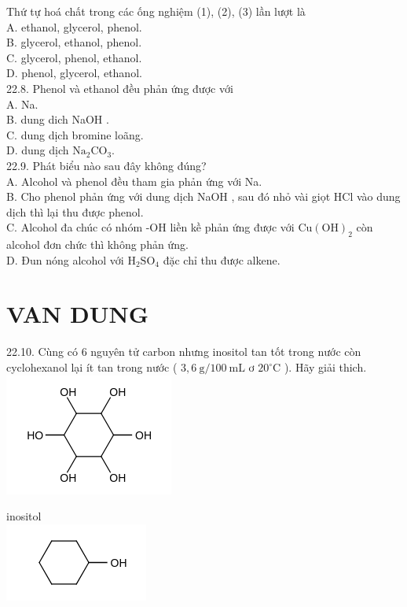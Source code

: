 \documentclass[10pt]{article}
\begin{document}
Thứ tự hoá chất trong các ống nghiệm (1), (2), (3) lần lượt là\\
A. ethanol, glycerol, phenol.\\
B. glycerol, ethanol, phenol.\\
C. glycerol, phenol, ethanol.\\
D. phenol, glycerol, ethanol.\\
22.8. Phenol và ethanol đều phản ứng được với\\
A. Na.\\
B. dung dich NaOH .\\
C. dung dịch bromine loãng.\\
D. dung dịch $\mathrm{Na}_{2} \mathrm{CO}_{3}$.\\
22.9. Phát biểu nào sau đây không đúng?\\
A. Alcohol và phenol đều tham gia phản ứng với Na.\\
B. Cho phenol phản ứng với dung dịch NaOH , sau đó nhỏ vài giọt HCl vào dung dịch thì lại thu được phenol.\\
C. Alcohol đa chúc có nhóm -OH liền kề phản ứng được với $\mathrm{Cu}(\mathrm{OH})_{2}$ còn alcohol đơn chức thì không phản ứng.\\
D. Đun nóng alcohol với $\mathrm{H}_{2} \mathrm{SO}_{4}$ đặc chỉ thu được alkene.

\section*{VAN DUNG}
22.10. Cùng có 6 nguyên tử carbon nhưng inositol tan tốt trong nước còn cyclohexanol lại ít tan trong nước ( $3,6 \mathrm{~g} / 100 \mathrm{~mL}$ ơ $20^{\circ} \mathrm{C}$ ). Hãy giải thich.\\
\includegraphics{smile-77a43e707b8417739122b0d00cafca4c13b5d572}

inositol\\
\includegraphics{smile-17550bb25aacf231c51ee2a191209257f2a78244}
\end{document}
